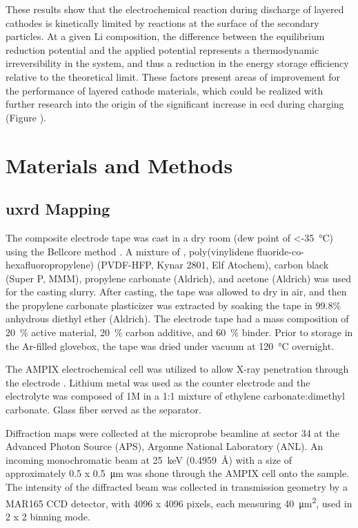 \documentclass{article}
\begin{document}
These
  results show that the electrochemical reaction during discharge of
  layered cathodes is kinetically limited by reactions at the surface
  of the secondary particles. At a given Li composition, the
  difference between the equilibrium reduction potential and the
  applied potential represents a thermodynamic irreversibility in the
  system, and thus a reduction in the energy storage efficiency
  relative to the theoretical limit. These factors present areas of
improvement for the performance of layered cathode materials, which
could be realized with further research into the origin of the
significant increase in \gls{ecd} during charging (Figure
).

\section*{Materials and Methods}
\label{sec:methods}

\subsection*{\gls{uxrd} Mapping}

The \nca{} composite electrode tape was cast in a dry room (dew point
of \SI{<-35}{\celsius}) using the Bellcore method \cite{warren1996}. A
mixture of \nca{}, poly(vinylidene fluoride-co-hexafluoropropylene)
(PVDF-HFP, Kynar 2801, Elf Atochem), carbon black (Super P, MMM),
propylene carbonate (Aldrich), and acetone (Aldrich) was used for the
casting slurry. After casting, the tape was allowed to dry in air, and
then the propylene carbonate plasticizer was extracted by soaking the
tape in 99.8\% anhydrous diethyl ether (Aldrich). The electrode tape
had a mass composition of \SI{20}{\percent} active material,
\SI{20}{\percent} carbon additive, and \SI{60}{\percent} binder. Prior
to storage in the Ar-filled glovebox, the tape was dried under vacuum
at \SI{120}{\celsius} overnight.

The AMPIX electrochemical cell was utilized to allow X-ray penetration
through the electrode \cite{borkiewicz2012}. Lithium metal was used as
the counter electrode and the electrolyte was composed of 1M
 in a 1:1 mixture of ethylene carbonate:dimethyl
carbonate. Glass fiber served as the separator.

Diffraction maps were collected at the microprobe beamline at sector
34 at the Advanced Photon Source (APS), Argonne National Laboratory
(ANL). An incoming monochromatic beam at \SI{25}{\kilo\electronvolt}
(\SI{0.4959}{\angstrom}) with a size of approximately \num{0.5} x
\SI{0.5}{\micro\meter} was shone through the AMPIX cell onto the
sample. The intensity of the diffracted beam was collected in
transmission geometry by a MAR165 CCD detector, with 4096 x 4096
pixels, each measuring \SI{40}{\square\micro\meter}, used in 2 x 2
binning mode.
\end{document}
